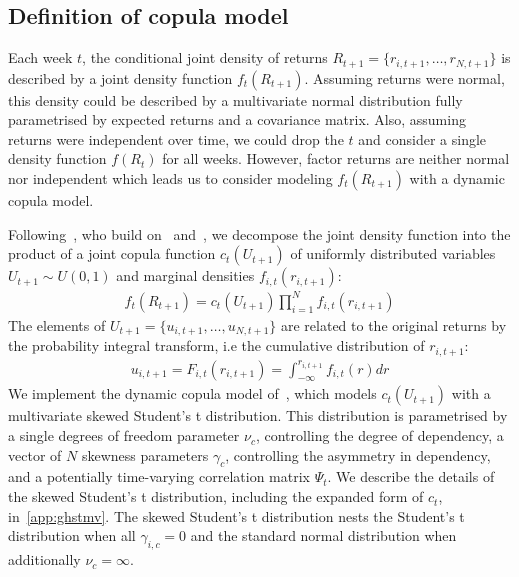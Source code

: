
\subsection{Definition of copula model} %
\label{sub:definition_of_copula_model}

Each week $t$, the conditional joint density of returns $R_{t+1} = \{r_{i,t+1},\ldots,r_{N,t+1}\}$ is described by a joint density function $f_t(R_{t+1})$. Assuming returns were normal, this density could be described by a multivariate normal distribution fully parametrised by expected returns and a covariance matrix. Also, assuming returns were independent over time, we could drop the $t$ and consider a single density function $f(R_t)$ for all weeks. However, factor returns are neither normal nor independent which leads us to consider modeling $f_t(R_{t+1})$ with a dynamic copula model.

Following~\textcite{ChristoffersenErrunzaJacobLanglois2012}, who build on~\textcite{Patton2006} and~\textcite{Sklar1959}, we decompose the joint density function into the product of a joint copula function $c_t(U_{t+1})$ of uniformly distributed variables $U_{t+1} \sim U(0, 1)$ and marginal densities $f_{i,t}(r_{i,t+1})$:
\begin{align}
  f_t(R_{t+1}) =
    c_t(U_{t+1}) \prod^N_{i=1} f_{i,t}(r_{i,t+1})
  \label{eq:copula_sklar}
\end{align}
The elements of $U_{t+1} = \{u_{i,t+1},\ldots,u_{N,t+1}\}$ are related to the original returns by the probability integral transform, i.e the cumulative distribution of $r_{i,t+1}$:
\begin{align}
  u_{i,t+1} = F_{i,t}(r_{i,t+1}) = \int_{-\infty}^{r_{i,t+1}} f_{i,t}(r)dr
\end{align}
We implement the dynamic copula model of~\textcite{ChristoffersenLanglois2013}, which models $c_t(U_{t+1})$ with a multivariate skewed Student's t distribution. This distribution is parametrised by a single degrees of freedom parameter $\nu_c$, controlling the degree of dependency, a vector of $N$ skewness parameters $\gamma_c$, controlling the asymmetry in dependency, and a potentially time-varying correlation matrix $\Psi_{t}$. We describe the details of the skewed Student's t distribution, including the expanded form of $c_t$, in~\autoref{app:ghstmv}. The skewed Student's t distribution nests the Student's t distribution when all $\gamma_{i,c} = 0$ and the standard normal distribution when additionally $\nu_c = \infty$.

